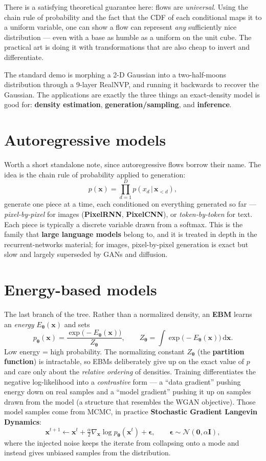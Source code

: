 \documentclass[11pt, oneside]{book}
\newcommand{\grad}{\nabla}
\newcommand{\dd}{\,\mathrm{d}}
\newcommand{\eye}{\mathbf{I}}
\newcommand{\zeros}{\mathbf{0}}
\newcommand{\params}{\boldsymbol{\theta}}
\newcommand{\xvec}{\mathbf{x}}
\newcommand{\Normal}{\mathcal{N}}
\newcommand{\given}{\,\vert\,}
\begin{document}
\begin{intbox}
There is a satisfying theoretical guarantee here: flows are \emph{universal}. Using
the chain rule of probability and the fact that the CDF of each conditional maps it
to a uniform variable, one can show a flow can represent \emph{any} sufficiently
nice distribution --- even with a base as humble as a uniform on the unit cube. The
practical art is doing it with transformations that are also cheap to invert and
differentiate.
\end{intbox}

The standard demo is morphing a 2-D Gaussian into a two-half-moons distribution
through a 9-layer RealNVP, and running it backwards to recover the Gaussian. The
applications are exactly the three things an exact-density model is good for:
\textbf{density estimation}, \textbf{generation/sampling}, and \textbf{inference}.

\section{Autoregressive models}

Worth a short standalone note, since autoregressive flows borrow their name. The
idea is the chain rule of probability applied to generation:
\[
  p(\xvec) = \prod_{d=1}^{D} p(x_d \given \xvec_{<d}),
\]
generate one piece at a time, each conditioned on everything generated so far ---
\emph{pixel-by-pixel} for images (\textbf{PixelRNN}, \textbf{PixelCNN}), or
\emph{token-by-token} for text. Each piece is typically a discrete variable drawn
from a softmax. This is the family that \textbf{large language models} belong to,
and it is treated in depth in the recurrent-networks material; for images,
pixel-by-pixel generation is exact but slow and largely superseded by GANs and
diffusion.

\section{Energy-based models}

The last branch of the tree. Rather than a normalized density, an \textbf{EBM}
learns an \emph{energy} $E_{\params}(\xvec)$ and sets
\[
  p_{\params}(\xvec) = \frac{\exp\!\bigl(-E_{\params}(\xvec)\bigr)}{Z_{\params}},
  \qquad
  Z_{\params} = \int \exp\!\bigl(-E_{\params}(\xvec)\bigr)\dd\xvec .
\]
Low energy = high probability. The normalizing constant $Z_{\params}$ (the
\textbf{partition function}) is intractable, so EBMs deliberately give up on the
exact value of $p$ and care only about the \emph{relative ordering} of densities.
Training differentiates the negative log-likelihood into a \emph{contrastive}
form --- a ``data gradient'' pushing energy down on real samples and a ``model
gradient'' pushing it up on samples drawn from the model (a structure that
resembles the WGAN objective). Those model samples come from MCMC, in practice
\textbf{Stochastic Gradient Langevin Dynamics}:
\[
  \xvec^{t+1} \leftarrow \xvec^{t} + \tfrac{\alpha}{2}\grad_{\xvec}\log p_{\params}(\xvec^t) + \boldsymbol{\epsilon},
  \qquad \boldsymbol{\epsilon}\sim\Normal(\zeros,\alpha\eye),
\]
where the injected noise keeps the iterate from collapsing onto a mode and instead
gives unbiased samples from the distribution.
\end{document}
